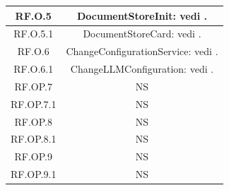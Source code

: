 \documentclass[10pt, a4paper]{article}
\begin{document}
\begin{xltabular}{\textwidth}{c|c}
\hline 
RF.O.5  & DocumentStoreInit: vedi .\\
\hline 
RF.O.5.1  & DocumentStoreCard: vedi .\\
\hline
 RF.O.6  & ChangeConfigurationService: vedi .\\
\hline 
RF.O.6.1 & ChangeLLMConfiguration: vedi .\\

\hline 
RF.OP.7  & NS \\
\hline 
RF.OP.7.1 & NS \\
\hline 
RF.OP.8 & NS \\
\hline 
RF.OP.8.1 & NS \\
\hline 
RF.OP.9 & NS \\
\hline 
RF.OP.9.1 & NS \\


\end{xltabular}
\end{document}
